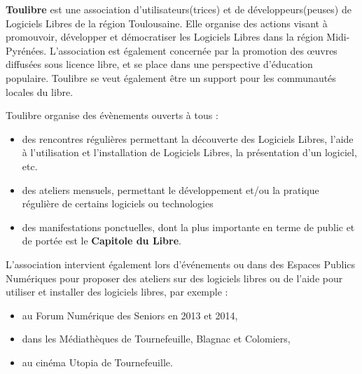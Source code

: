 
\textbf{Toulibre} est une association d'utilisateurs(trices) et de 
développeurs(peuses) de Logiciels Libres de la région Toulousaine. 
Elle organise des actions visant à promouvoir, développer et 
démocratiser les Logiciels Libres dans la région Midi-Pyrénées. 
L'association est également concernée par la promotion des œuvres 
diffusées sous licence libre, et se place dans une perspective 
d'éducation populaire.
Toulibre se veut également être un support pour les communautés 
locales du libre.

\Separateur

Toulibre organise des évènements ouverts à tous :
\begin{itemize}[label=$\bullet$]
\item des rencontres régulières permettant la découverte des 
Logiciels Libres, l'aide à l'utilisation et l'installation de 
Logiciels Libres, la présentation d'un logiciel, etc.
\item des ateliers mensuels, permettant le développement et/ou la 
pratique régulière de certains logiciels ou technologies
\item des manifestations ponctuelles, dont la plus importante en terme 
de public et de portée est le \textbf{Capitole du Libre}.
\end{itemize}

L'association intervient également lors d'événements ou dans des 
Espaces Publics Numériques pour proposer des ateliers sur des 
logiciels libres ou de l'aide pour utiliser et installer des logiciels 
libres, par exemple :
\begin{itemize}[label=$\bullet$]
\item au Forum Numérique des Seniors en 2013 et 2014,
\item dans les Médiathèques de Tournefeuille, Blagnac et Colomiers,
\item au cinéma Utopia de Tournefeuille.
\end{itemize}
